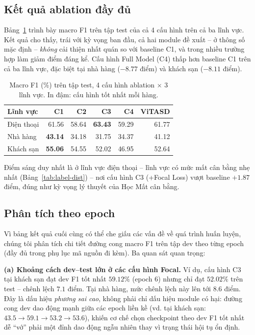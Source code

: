 \documentclass[11pt]{article}
\begin{document}
\subsection{Kết quả ablation đầy đủ}
Bảng~\ref{tab:full-ablation} trình bày macro F1 trên tập test của cả 4 cấu hình trên cả ba lĩnh vực. Kết quả cho thấy, trái với kỳ vọng ban đầu, cả hai module đề xuất -- ở thông số mặc định -- \emph{không} cải thiện nhất quán so với baseline C1, và trong nhiều trường hợp làm giảm điểm đáng kể. Cấu hình Full Model (C4) thấp hơn baseline C1 trên cả ba lĩnh vực, đặc biệt tại nhà hàng ($-8.77$ điểm) và khách sạn ($-8.11$ điểm).

\begin{table}[t]
\centering
\small
\begin{tabular}{lrrrrr}
\toprule
\textbf{Lĩnh vực} & \textbf{C1} & \textbf{C2} & \textbf{C3} & \textbf{C4} & \textbf{ViTASD} \\
\midrule
Điện thoại & 61.56 & 58.64 & \textbf{63.43} & 59.29 & 61.77 \\
Nhà hàng   & \textbf{43.14} & 34.18 & 31.75 & 34.37 & 41.12 \\
Khách sạn  & \textbf{55.06} & 54.55 & 52.02 & 46.95 & 52.64 \\
\bottomrule
\end{tabular}
\caption{Macro F1 (\%) trên tập test, 4 cấu hình ablation $\times$ 3 lĩnh vực. In đậm: cấu hình tốt nhất mỗi hàng.}
\label{tab:full-ablation}
\end{table}

Điểm sáng duy nhất là ở lĩnh vực điện thoại -- lĩnh vực có mức mất cân bằng nhẹ nhất (Bảng~\ref{tab:label-dist}) -- nơi cấu hình C3 (+Focal Loss) vượt baseline $+1.87$ điểm, đúng như kỳ vọng lý thuyết của Học Mất cân bằng.

\subsection{Phân tích theo epoch}
\label{sec:epoch-analysis}
Vì bảng kết quả cuối cùng có thể che giấu các vấn đề về quá trình huấn luyện, chúng tôi phân tích chi tiết đường cong macro F1 trên tập dev theo từng epoch (đầy đủ trong phụ lục mã nguồn đi kèm). Ba quan sát quan trọng:

\textbf{(a) Khoảng cách dev--test lớn ở các cấu hình Focal.} Ví dụ, cấu hình C3 tại khách sạn đạt dev F1 tốt nhất $59.12\%$ (epoch 6) nhưng chỉ đạt $52.02\%$ trên test -- chênh lệch $7.1$ điểm. Tại nhà hàng, mức chênh lệch này lên tới $8.6$ điểm. Đây là dấu hiệu \textit{phương sai cao}, không phải chỉ dấu hiệu module có hại: đường cong dev dao động mạnh giữa các epoch liền kề (vd. tại khách sạn: $43.5 \rightarrow 59.1 \rightarrow 53.2 \rightarrow 53.6$), khiến cơ chế chọn checkpoint theo dev F1 tốt nhất dễ ``vớ'' phải một đỉnh dao động ngẫu nhiên thay vì trạng thái hội tụ ổn định.
\end{document}
